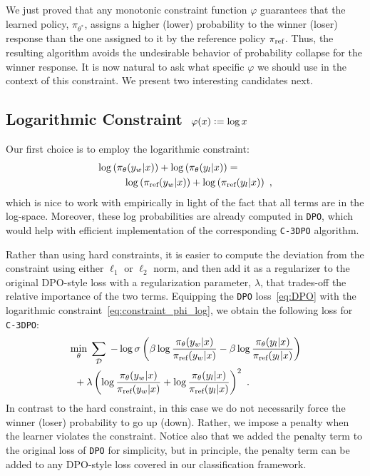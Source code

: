 We just proved that any monotonic constraint function $\varphi$ guarantees that the learned policy, $\pi_{\theta^*}$, assigns a higher (lower) probability to the winner (loser) response than the one assigned to it by the reference policy $\pi_{\textrm{ref}}$. Thus, the resulting algorithm avoids the undesirable behavior of probability collapse for the winner response. It is now natural to ask what specific $\varphi$ we should use in the context of this constraint. We present two interesting candidates next. 

\subsection{Logarithmic Constraint $\;\varphi(x) \mathrel{\mathop:}= \log x$}
\label{subsec:Log-constraint}

Our first choice is to employ the logarithmic constraint:
%
\begin{eqnarray}
\log\left(\pi_{\theta}(y_w|x)\right) + \log\left(\pi_{\theta}(y_l|x)\right) = \nonumber \\
&& \hspace{-1.7in} \log\left(\piRef(y_w|x)\right) + \log\left(\piRef(y_l|x)\right)\ ,
\label{eq:constraint_phi_log}
\end{eqnarray}
%
which is nice to work with empirically in light of the fact that all terms are in the log-space. Moreover, these log probabilities are already computed in \texttt{DPO}, which would help with efficient implementation of the corresponding \texttt{C-3DPO} algorithm. 

Rather than using hard constraints, it is easier to compute the deviation from the constraint using either $\ell_1$ or $\ell_2$ norm, and then add it as a regularizer to the original DPO-style loss with a regularization parameter, $\lambda$, that trades-off the relative importance of the two terms. 
Equipping the \texttt{DPO} loss~\eqref{eq:DPO} with the logarithmic constraint~\eqref{eq:constraint_phi_log}, we obtain the following loss for \texttt{C-3DPO}:
%
\begin{align}
&\min_{\theta}\;\sum_{\mathcal{D}} \; -\log \sigma\left(\beta\log\frac{\pi_{\theta}(y_w|x)}{\pi_{\textrm{ref}}(y_w|x)} - \beta\log\frac{\pi_{\theta}(y_l|x)}{\pi_{\textrm{ref}}(y_l|x)}\right) \nonumber \\ 
&\;\;+\lambda\left(\log\frac{\pi_{\theta}(y_w|x)}{\pi_{\textrm{ref}}(y_w|x)} + \log\frac{\pi_{\theta}(y_l|x)}{\pi_{\textrm{ref}}(y_l|x)}\right)^{2}\ .
\label{eq:C2DPO-log}
\end{align}
%
In contrast to the hard constraint, in this case we do not necessarily force the winner (loser) probability to go up (down). Rather, we impose a penalty when the learner violates the constraint. Notice also that we added the penalty term to the original loss of \texttt{DPO} for simplicity, but in principle, the penalty term can be added to any DPO-style loss covered in our classification framework.

